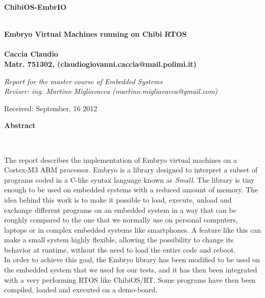 \documentclass[a4paper,10pt]{article}
\newenvironment*{mytitle}{\begin{LARGE}\bf}{\end{LARGE}\\}%
\newenvironment*{mysubtitle}{\bf}{\\[1.5ex]}%
\newenvironment*{myabstract}{\begin{Large}\bf}{\end{Large}\\[2.5ex]}%
\begin{document}
\begin{mytitle}ChibiOS-EmbrIO\end{mytitle}
\begin{mysubtitle}Embryo Virtual Machines running on Chibi RTOS\end{mysubtitle}
%
%
\\
Caccia Claudio\\
Matr. 751302, (claudiogiovanni.caccia@mail.polimi.it)\\
\hspace{10ex}
\begin{flushright}
\emph{Report for the master course of Embedded Systems}\\
\emph{Reviser: ing. Martino Migliavacca (martino.migliavacca@gmail.com)}
\end{flushright}

Received: September, 16 2012\\
\hspace{10ex}

\begin{myabstract} Abstract \end{myabstract}

The report describes the implementation of Embryo virtual machines on a Cortex\texttrademark-M3 ARM processor. Embryo is a library designed to interpret a subset of programs coded in a C-like syntax language known as \textit{Small}. The library is tiny enough to be used on embedded systems with a reduced amount of memory. The idea behind this work is to make it possible to load, execute, unload and exchange different programs on an embedded system in a way that can be roughly compared to the one that we normally use on personal computers, laptops or in complex embedded systems like smartphones. A feature like this can make a small system highly flexible, allowing the possibility to change its behavior at runtime, without the need to load the entire code and reboot.\\
In order to achieve this goal, the Embryo library has been modified to be used on the embedded system that we used for our tests, and it has then been integrated with a very performing RTOS like ChibiOS/RT. Some programs have then been compiled, loaded and executed on a demo-board.
\end{document}
